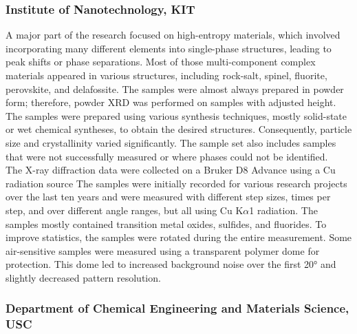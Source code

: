 \subsubsection*{Institute of Nanotechnology, KIT}

A major part of the research focused on high-entropy materials, which involved incorporating many different elements into single-phase structures, leading to peak shifts or phase separations. Most of those multi-component complex materials appeared in various structures, including rock-salt, spinel, fluorite, perovskite, and delafossite. The samples were almost always prepared in powder form; therefore, powder XRD was performed on samples with adjusted height. The samples were prepared using various synthesis techniques, mostly solid-state or wet chemical syntheses, to obtain the desired structures. Consequently, particle size and crystallinity varied significantly. The sample set also includes samples that were not successfully measured or where phases could not be identified. \\

The X-ray diffraction data were collected on a Bruker D8 Advance using a Cu radiation source  The samples were initially recorded for various research projects over the last ten years and were measured with different step sizes, times per step, and over different angle ranges, but all using Cu K$\alpha$1 radiation. The samples mostly contained transition metal oxides, sulfides, and fluorides. To improve statistics, the samples were rotated during the entire measurement. Some air-sensitive samples were measured using a transparent polymer dome for protection. This dome led to increased background noise over the first 20° and slightly decreased pattern resolution. \\ 

\subsubsection*{Department of Chemical Engineering and Materials Science, USC}

